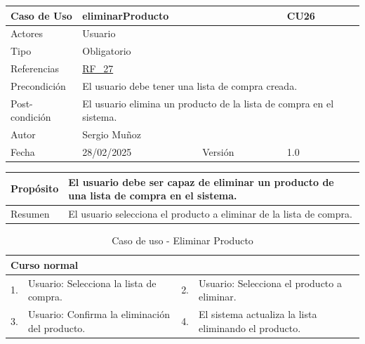 \newpage

\begin{table}[H]
    \centering
    \begin{tabular}{| m{} | m{} | m{} | m{} |}
        \hline
        \rowcolor[HTML]{C0C0C0} Caso de Uso & \multicolumn{2}{|m{0.43\textwidth}|}{eliminarProducto} &  CU26\\ 
        \hline
        Actores & \multicolumn{3}{l|}{Usuario} \\ 
        \hline
        Tipo & \multicolumn{3}{l|}{Obligatorio} \\ 
        \hline
        Referencias & \multicolumn{3}{l|}{\hyperref[req:RF27]{RF\_27}} \\ 
        \hline
        Precondición & \multicolumn{3}{m{0.67\textwidth}|}{El usuario debe tener una lista de compra creada.} \\ 
        \hline
        Post-condición & \multicolumn{3}{m{0.67\textwidth}|}{El usuario elimina un producto de la lista de compra en el sistema.} \\ 
        \hline
        Autor & \multicolumn{3}{l|}{Sergio Muñoz} \\ 
        \hline
        Fecha & 28/02/2025 & Versión & 1.0 \\ 
        \hline
    \end{tabular}
\end{table}

\begin{table}[H]
    \centering
    \begin{tabular}{| m{} | m{} | m{} | m{} |}
        \hline
        Propósito & \multicolumn{3}{m{0.67\textwidth}|}{El usuario debe ser capaz de eliminar un producto de una lista de compra en el sistema.} \\ 
        \hline
        Resumen & \multicolumn{3}{m{0.67\textwidth}|}{El usuario selecciona el producto a eliminar de la lista de compra.} \\ 
        \hline
    \end{tabular}
\end{table}

\begin{table}[H]
    \centering
    \begin{tabular}{| m{} | m{} | m{} | m{} |}
        \hline
        \multicolumn{4}{|m{0.9\textwidth}|}{Curso normal} \\ 
        \hline
        1. & Usuario: Selecciona la lista de compra. 
        & 2. & Usuario: Selecciona el producto a eliminar. \\ 
        \hline
        3. & Usuario: Confirma la eliminación del producto. 
        & 4. & El sistema actualiza la lista eliminando el producto. \\ 
        \hline
    \end{tabular}
    \caption{Caso de uso - Eliminar Producto}
\end{table}

